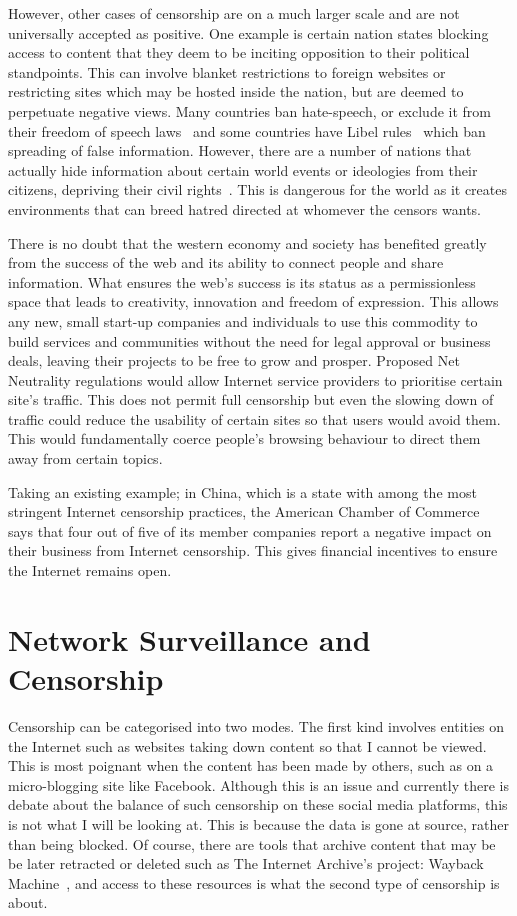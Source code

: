 \documentclass[ %
                    author={Samuel Russell},
                supervisor={Prof. Bogdan Warinschi},
                    degree={MEng},
                     title={Innocuous Ciphertexts},
                  subtitle={The DE-CENSOR Scheme},
                      type={research},
                      year={2018} ]{dissertation}
\begin{document}
However, other cases of censorship are on a much larger scale and are not universally accepted as positive. One example is certain nation states blocking access to content that they deem to be inciting opposition to their political standpoints. This can involve blanket restrictions to foreign websites or restricting sites which may be hosted inside the nation, but are deemed to perpetuate negative views. Many countries ban hate-speech, or exclude it from their freedom of speech laws~\cite{hate} and some countries have Libel rules~\cite{libel} which ban spreading of false information. However, there are a number of nations that actually hide information about certain world events or ideologies from their citizens, depriving their civil rights~\cite{chincensor}. This is dangerous for the world as it creates environments that can breed hatred directed at whomever the censors wants.

There is no doubt that the western economy and society has benefited greatly from the success of the web and its ability to connect people and share information. What ensures the web's success is its status as a permissionless space that leads to creativity, innovation and freedom of expression. This allows any new, small start-up companies and individuals to use this commodity to build services and communities without the need for legal approval or business deals, leaving their projects to be free to grow and prosper. Proposed Net Neutrality regulations would allow Internet service providers to prioritise certain site's traffic. This does not permit full censorship but even the slowing down of traffic could reduce the usability of certain sites so that users would avoid them. This would fundamentally coerce people's browsing behaviour to direct them away from certain topics.

Taking an existing example; in China, which is a state with among the most stringent Internet censorship practices, the American Chamber of Commerce~\cite{amcham} says that four out of five of its member companies report a negative impact on their business from Internet censorship. This gives financial incentives to ensure the Internet remains open.

\section{Network Surveillance and Censorship}

Censorship can be categorised into two modes. The first kind involves entities on the Internet such as websites taking down content so that I cannot be viewed. This is most poignant when the content has been made by others, such as on a micro-blogging site like Facebook. Although this is an issue and currently there is debate about the balance of such censorship on these social media platforms, this is not what I will be looking at. This is because the data is gone at source, rather than being blocked. Of course, there are tools that archive content that may be be later retracted or deleted such as The Internet Archive's project: Wayback Machine~\cite{wb}, and access to these resources is what the second type of censorship is about.
\end{document}
